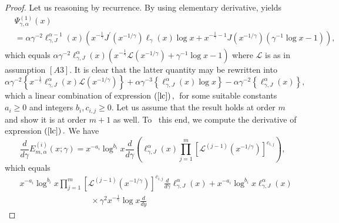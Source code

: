 \documentclass[12pt,reqno,openbib,runningheads,a4paper,portrait]{amsart}%
\begin{document}
\begin{proof}
Let us reasoning by recurrence. By using elementary derivative, yields%
\begin{align*}
&  \Psi_{\gamma,\alpha}^{\left(  1\right)  }\left(  x\right) \\
&  =\alpha\gamma^{-2}\ell_{\gamma,J}^{\alpha-1}\left(  x\right)  \left(
x^{-\frac{1}{\gamma}}J^{\prime}\left(  x^{-1/\gamma}\right)  \ell_{\gamma
}\left(  x\right)  \log x+x^{-\frac{1}{\gamma}-1}J\left(  x^{-1/\gamma
}\right)  \left(  \gamma^{-1}\log x-1\right)  \right)  ,
\end{align*}
which equals $\alpha\gamma^{-2}\ell_{\gamma,J}^{\alpha}\left(  x\right)
\left(  x^{-\frac{1}{\gamma}}\mathcal{L}\left(  x^{-1/\gamma}\right)
+\gamma^{-1}\log x-1\right)  $ where $\mathcal{L}$ is as in assumption
$\left[  A3\right]  .$ It is clear that the latter quantity may be rewritten
into
\begin{equation}
\alpha\gamma^{-2}\left\{  x^{-\frac{1}{\gamma}}\ell_{\gamma,J}^{\alpha}\left(
x\right)  \mathcal{L}\left(  x^{-1/\gamma}\right)  \right\}  +\alpha
\gamma^{-3}\left\{  \ell_{\gamma,J}^{\alpha}\left(  x\right)  \log x\right\}
-\alpha\gamma^{-2}\left\{  \ell_{\gamma,J}^{\alpha}\left(  x\right)  \right\}
, \label{la}%
\end{equation}
which a linear combination of expression $\left(  \ref{lc}\right)  ,$\ for
some suitable constants $a_{i}\geq0$ and integers $b_{i},c_{i,j}\geq0.$ Let us
assume that the result holds at order $m$ and show it is at order $m+1 $ as
well. To \ this end, we compute the derivative of expression $\left(
\ref{lc}\right)  .$ We have
\[
\frac{d}{d\gamma}E_{m,\alpha}^{\left(  i\right)  }\left(  x;\gamma\right)
=x^{-a_{i}}\log^{b_{i}}x\frac{d}{d\gamma}\left(  \ell_{\gamma,J}^{\alpha
}\left(  x\right)
{\textstyle\prod_{j=1}^{m}}
\left[  \mathcal{L}^{\left(  j-1\right)  }\left(  x^{-1/\gamma}\right)
\right]  ^{c_{i,j}}\right)  ,
\]
which equals%
\begin{align}
&  x^{-a_{i}}\log^{b_{i}}x%
{\textstyle\prod_{j=1}^{m}}
\left[  \mathcal{L}^{\left(  j-1\right)  }\left(  x^{-1/\gamma}\right)
\right]  ^{c_{i,j}}\frac{d}{d\gamma}\ell_{\gamma,J}^{\alpha}\left(  x\right)
+x^{-a_{i}}\log^{b_{i}}x\ell_{\gamma,J}^{\alpha}\left(  x\right)
\label{latter-exp}\\
&
\ \ \ \ \ \ \ \ \ \ \ \ \ \ \ \ \ \ \ \ \ \ \ \ \ \ \ \ \ \ \ \ \ \ \ \ \ \ \ \times
\gamma^{2}x^{-\frac{1}{\gamma}}\log x\left.  \frac{d}{dy}%

\end{align}
\end{proof}
\end{document}
